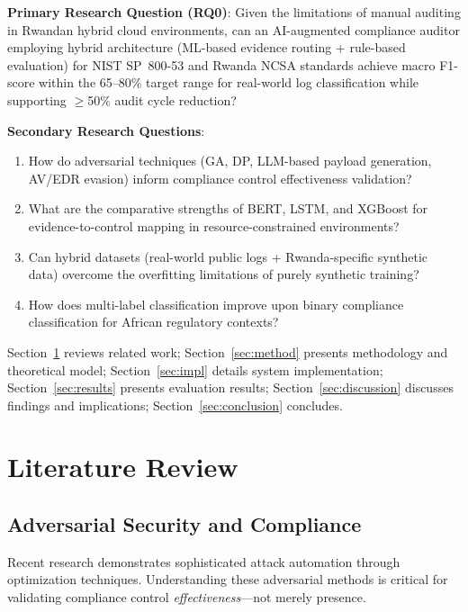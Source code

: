 \documentclass[futureinternet,article,submit,pdftex,moreauthors]{Definitions/mdpi}
\begin{document}
\textbf{Primary Research Question (RQ0)}: Given the limitations of manual auditing in Rwandan
hybrid cloud environments, can an AI-augmented compliance auditor employing hybrid architecture
(ML-based evidence routing + rule-based evaluation) for NIST SP~800-53 and Rwanda NCSA
standards achieve macro F1-score within the 65--80\% target range for real-world log
classification while supporting $\geq$50\% audit cycle reduction?

\textbf{Secondary Research Questions}:
\begin{enumerate}
\item[\textbf{RQ1}] How do adversarial techniques (GA, DP, LLM-based payload generation,
AV/EDR evasion) inform compliance control effectiveness validation?
\item[\textbf{RQ2}] What are the comparative strengths of BERT, LSTM, and XGBoost for
evidence-to-control mapping in resource-constrained environments?
\item[\textbf{RQ3}] Can hybrid datasets (real-world public logs + Rwanda-specific synthetic
data) overcome the overfitting limitations of purely synthetic training?
\item[\textbf{RQ4}] How does multi-label classification improve upon binary compliance
classification for African regulatory contexts?
\end{enumerate}

Section~\ref{sec:lit} reviews related work; Section~\ref{sec:method} presents methodology
and theoretical model; Section~\ref{sec:impl} details system implementation;
Section~\ref{sec:results} presents evaluation results; Section~\ref{sec:discussion} discusses
findings and implications; Section~\ref{sec:conclusion} concludes.

\section{Literature Review}
\label{sec:lit}

\subsection{Adversarial Security and Compliance}

Recent research demonstrates sophisticated attack automation through optimization techniques.
Understanding these adversarial methods is critical for validating compliance control
\textit{effectiveness}---not merely presence.
\end{document}
